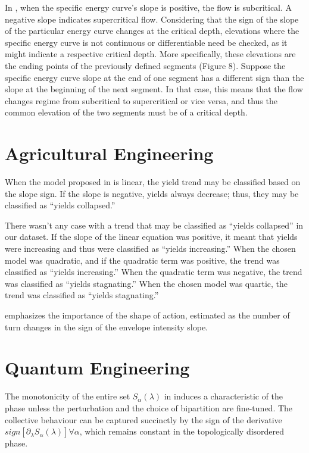 \documentclass[11pt]{book}
\begin{document}
In \cite{petikas2020calculation}, when the specific energy curve's
slope is positive, the flow is subcritical. A negative slope indicates
supercritical flow. Considering that the sign of the slope of the
particular energy curve changes at the critical depth, elevations
where the specific energy curve is not continuous or differentiable
need be checked, as it might indicate a respective critical depth.
More specifically, these elevations are the ending points of the previously
defined segments (Figure 8). Suppose the specific energy curve slope
at the end of one segment has a different sign than the slope at the
beginning of the next segment. In that case, this means that the flow
changes regime from subcritical to supercritical or vice versa, and
thus the common elevation of the two segments must be of a critical
depth.


\section{Agricultural Engineering}
When the model proposed in \cite{zymaroieva2020spatial} is linear, the yield trend may be classified based on the slope sign. If the slope is negative, yields always decrease; thus, they may be classified as ``yields collapsed.'' 

There wasn't any case with a trend that may be classified as ``yields collapsed'' in our dataset. If the slope of the linear equation was positive, it meant that yields were increasing and thus were classified  as ``yields increasing.'' When the chosen model was quadratic, and if the quadratic term was positive, the trend was classified as ``yields increasing.'' When the quadratic term was negative, the trend was classified as ``yields stagnating.'' When the chosen model was quartic, the trend was classified as ``yields stagnating.'' 
  
\cite{ngo2020research} emphasizes the importance of the shape of action, estimated as the number of turn changes in the sign of the envelope intensity slope.


\section{Quantum Engineering}
The monotonicity of the entire set $S_{\alpha}\left(\lambda\right)$ in \cite{santra2014local} induces a characteristic of the phase unless the perturbation and the choice of bipartition are fine-tuned. The collective behaviour can be captured succinctly by the sign of the derivative $sign\left[\partial_{\lambda}S_{\alpha}\left(\lambda\right)\right]\forall\alpha$, which remains constant in the topologically disordered phase.
\end{document}
